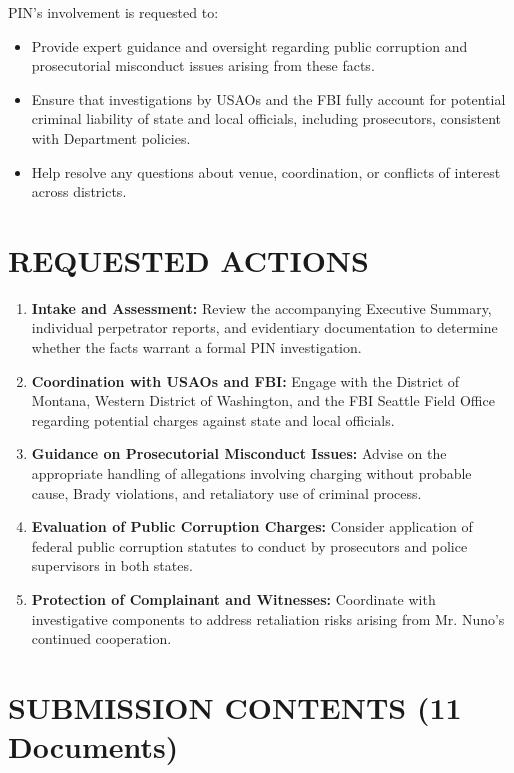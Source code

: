 \documentclass[12pt,oneside]{article}
\begin{document}
\begin{flushleft}
PIN's involvement is requested to:

\begin{itemize}
\item Provide expert guidance and oversight regarding public corruption and prosecutorial misconduct issues arising from these facts.
\item Ensure that investigations by USAOs and the FBI fully account for potential criminal liability of state and local officials, including prosecutors, consistent with Department policies.
\item Help resolve any questions about venue, coordination, or conflicts of interest across districts.
\end{itemize}

\section*{REQUESTED ACTIONS}

\begin{enumerate}
\item \textbf{Intake and Assessment:} Review the accompanying Executive Summary, individual perpetrator reports, and evidentiary documentation to determine whether the facts warrant a formal PIN investigation.
\item \textbf{Coordination with USAOs and FBI:} Engage with the District of Montana, Western District of Washington, and the FBI Seattle Field Office regarding potential charges against state and local officials.
\item \textbf{Guidance on Prosecutorial Misconduct Issues:} Advise on the appropriate handling of allegations involving charging without probable cause, Brady violations, and retaliatory use of criminal process.
\item \textbf{Evaluation of Public Corruption Charges:} Consider application of federal public corruption statutes to conduct by prosecutors and police supervisors in both states.
\item \textbf{Protection of Complainant and Witnesses:} Coordinate with investigative components to address retaliation risks arising from Mr. Nuno's continued cooperation.
\end{enumerate}

\section*{SUBMISSION CONTENTS (11 Documents)}


\end{flushleft}
\end{document}
